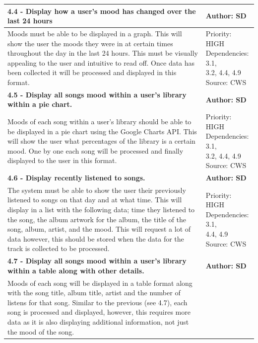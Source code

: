 \documentclass[10pt, notitlepage]{report}
\begin{document}
\begin{center}
\begin{longtable}{| p{13cm} | p{3cm} |}
\hline
\textbf{4.4 - Display how a user’s mood has changed over the last 24 hours} & \textbf{Author: SD} \\
\hline
Moods must be able to be displayed in a graph. This will show the user the  moods they were in at certain times throughout the day in the last 24 hours. This must be visually appealing to the user and intuitive to read off. Once data has been collected it will be processed and displayed in this format. &
\makecell{Priority: HIGH\\Dependencies: 3.1,\\3.2, 4.4, 4.9\\Source: CWS}\\
\hline
\textbf{4.5 - Display all songs mood within a user’s library within a pie chart.} & \textbf{Author: SD} \\
\hline
Moods of each song within a user’s library should be able to be displayed in a pie chart using the Google Charts API. This will show the user what percentages of the library is a certain mood. One by one each song will be processed and finally displayed to the user in this format.& 
\makecell{Priority: HIGH\\Dependencies: 3.1,\\3.2, 4.4, 4.9\\Source: CWS}\\
\hline
\textbf{4.6 - Display recently listened to songs.} & \textbf{Author: SD} \\
\hline
The system must be able to show the user their previously listened to songs on that day and at what time. This will display in a list with the following data; time they listened to the song, the album artwork for the album, the title of the song, album, artist, and the mood. This will request a lot of data however, this should be stored when the data for the track is collected to be processed.&
\makecell{Priority: HIGH\\Dependencies: 3.1,\\4.4, 4.9\\Source: CWS}\\
\hline
\textbf{4.7 - Display all songs mood within a user’s library within a table along with other details.} & \textbf{Author: SD} \\
\hline
Moods of each song will be displayed in a table format along with the song title, album title, artist and the number of listens for that song. Similar to the previous (see 4.7), each song is processed and displayed, however, this requires more data as it is also displaying additional information, not just the mood of the song. & 

\end{longtable}
\end{center}
\end{document}
